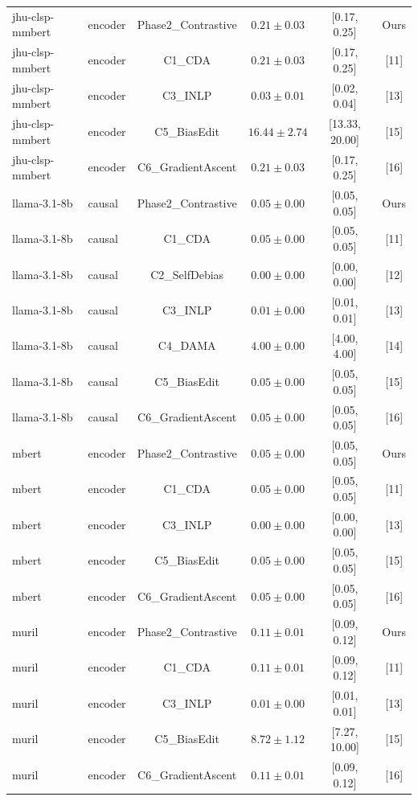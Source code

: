 \begin{table}[t]
\begin{tabular}{llcccc}
\midrule
  jhu-clsp-mmbert & encoder & Phase2_Contrastive & $0.21 \pm 0.03$ & [0.17, 0.25] & Ours \\
  jhu-clsp-mmbert & encoder & C1_CDA & $0.21 \pm 0.03$ & [0.17, 0.25] & [11] \\
  jhu-clsp-mmbert & encoder & C3_INLP & $0.03 \pm 0.01$ & [0.02, 0.04] & [13] \\
  jhu-clsp-mmbert & encoder & C5_BiasEdit & $16.44 \pm 2.74$ & [13.33, 20.00] & [15] \\
  jhu-clsp-mmbert & encoder & C6_GradientAscent & $0.21 \pm 0.03$ & [0.17, 0.25] & [16] \\
\midrule
  llama-3.1-8b & causal & Phase2_Contrastive & $0.05 \pm 0.00$ & [0.05, 0.05] & Ours \\
  llama-3.1-8b & causal & C1_CDA & $0.05 \pm 0.00$ & [0.05, 0.05] & [11] \\
  llama-3.1-8b & causal & C2_SelfDebias & $0.00 \pm 0.00$ & [0.00, 0.00] & [12] \\
  llama-3.1-8b & causal & C3_INLP & $0.01 \pm 0.00$ & [0.01, 0.01] & [13] \\
  llama-3.1-8b & causal & C4_DAMA & $4.00 \pm 0.00$ & [4.00, 4.00] & [14] \\
  llama-3.1-8b & causal & C5_BiasEdit & $0.05 \pm 0.00$ & [0.05, 0.05] & [15] \\
  llama-3.1-8b & causal & C6_GradientAscent & $0.05 \pm 0.00$ & [0.05, 0.05] & [16] \\
\midrule
  mbert & encoder & Phase2_Contrastive & $0.05 \pm 0.00$ & [0.05, 0.05] & Ours \\
  mbert & encoder & C1_CDA & $0.05 \pm 0.00$ & [0.05, 0.05] & [11] \\
  mbert & encoder & C3_INLP & $0.00 \pm 0.00$ & [0.00, 0.00] & [13] \\
  mbert & encoder & C5_BiasEdit & $0.05 \pm 0.00$ & [0.05, 0.05] & [15] \\
  mbert & encoder & C6_GradientAscent & $0.05 \pm 0.00$ & [0.05, 0.05] & [16] \\
\midrule
  muril & encoder & Phase2_Contrastive & $0.11 \pm 0.01$ & [0.09, 0.12] & Ours \\
  muril & encoder & C1_CDA & $0.11 \pm 0.01$ & [0.09, 0.12] & [11] \\
  muril & encoder & C3_INLP & $0.01 \pm 0.00$ & [0.01, 0.01] & [13] \\
  muril & encoder & C5_BiasEdit & $8.72 \pm 1.12$ & [7.27, 10.00] & [15] \\
  muril & encoder & C6_GradientAscent & $0.11 \pm 0.01$ & [0.09, 0.12] & [16] \\

\end{tabular}
\end{table}
